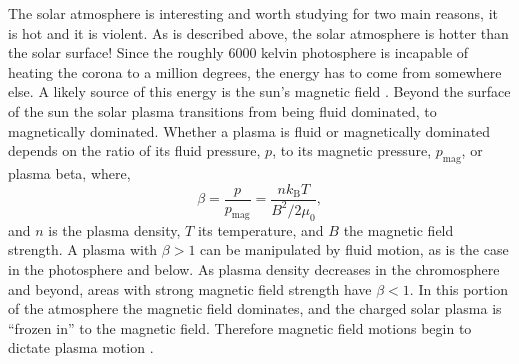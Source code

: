  
The solar atmosphere is interesting and worth studying for two main reasons, it is hot and it is violent.
As is described above, the solar atmosphere is hotter than the solar surface!
Since the roughly 6000 kelvin photosphere is incapable of heating the corona to a million degrees, the energy has to come from somewhere else.
A likely source of this energy is the sun's magnetic field \citep{Priest2014}.
Beyond the surface of the sun the solar plasma transitions from being fluid dominated, to magnetically dominated.
Whether a plasma is fluid or magnetically dominated depends on the ratio of its fluid pressure, $p$, to its magnetic pressure, $p_\text{mag}$, or plasma beta, where,
\begin{equation}
	\beta = \frac{p}{p_\text{mag}} = \frac{nk_\text{B}T}{B^2 / 2\mu_0},
\end{equation}
and $n$ is the plasma density, $T$ its temperature, and $B$ the magnetic field strength.
A plasma with $\beta>1$ can be manipulated by fluid motion, as is the case in the photosphere and below.
As plasma density decreases in the chromosphere and beyond, areas with strong magnetic field strength have $\beta<1$.  
In this portion of the atmosphere the magnetic field dominates, and the charged solar plasma is ``frozen in'' to the magnetic field.
Therefore magnetic field motions begin to dictate plasma motion \citep{Priest2014}.

